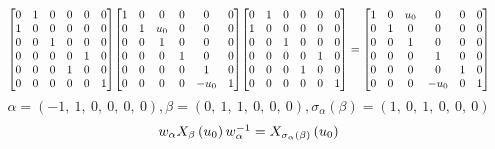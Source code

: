 \documentclass[11pt]{article}
\theoremstyle{definition}
\begin{document}
\[
\scaletoalign{\textwidth}{{\left[\begin{matrix}0 & 1 & 0 & 0 & 0 & 0\\1 & 0 & 0 & 0 & 0 & 0\\0 & 0 & 1 & 0 & 0 & 0\\0 & 0 & 0 & 0 & 1 & 0\\0 & 0 & 0 & 1 & 0 & 0\\0 & 0 & 0 & 0 & 0 & 1\end{matrix}\right]} {\left[\begin{matrix}1 & 0 & 0 & 0 & 0 & 0\\0 & 1 & u_{0} & 0 & 0 & 0\\0 & 0 & 1 & 0 & 0 & 0\\0 & 0 & 0 & 1 & 0 & 0\\0 & 0 & 0 & 0 & 1 & 0\\0 & 0 & 0 & 0 & - u_{0} & 1\end{matrix}\right]} {\left[\begin{matrix}0 & 1 & 0 & 0 & 0 & 0\\1 & 0 & 0 & 0 & 0 & 0\\0 & 0 & 1 & 0 & 0 & 0\\0 & 0 & 0 & 0 & 1 & 0\\0 & 0 & 0 & 1 & 0 & 0\\0 & 0 & 0 & 0 & 0 & 1\end{matrix}\right]} = {\left[\begin{matrix}1 & 0 & u_{0} & 0 & 0 & 0\\0 & 1 & 0 & 0 & 0 & 0\\0 & 0 & 1 & 0 & 0 & 0\\0 & 0 & 0 & 1 & 0 & 0\\0 & 0 & 0 & 0 & 1 & 0\\0 & 0 & 0 & - u_{0} & 0 & 1\end{matrix}\right]}}
\]
\[
\alpha = \left( -1, \  1, \  0, \  0, \  0, \  0\right), \beta = \left( 0, \  1, \  1, \  0, \  0, \  0\right), \sigma_{\alpha}(\beta) = \left( 1, \  0, \  1, \  0, \  0, \  0\right)
\]
\[
\scaletoalign{\textwidth}{w_{\alpha} X_{\beta}\left(u_{0}\right) w_{\alpha}^{-1} = X_{\sigma_{\alpha}\left(\beta\right)}\left(u_{0}\right)}
\]
\end{document}
